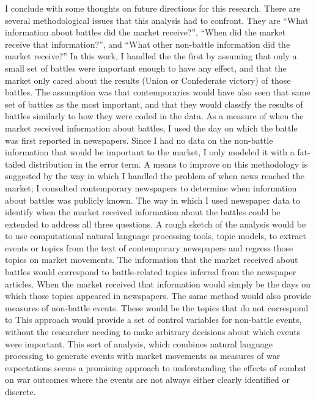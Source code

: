 I conclude with some thoughts on future directions for this research.
There are several methodological issues that this analysis had to confront.
They are ``What information about battles did the market receive?'', ``When did the market receive that information?'', and ``What other non-battle information did the market receive?''
In this work, I handled the the first by assuming that only a small set of battles were important enough to have any effect, and that the market only cared about the results (Union or Confederate victory) of those battles.
The assumption was that contemporaries would have also seen that same set of  battles as the most important, and that they would classify the results of battles similarly to how they were coded in the data.
As a measure of when the market received information about battles, I used the day on which the battle was first reported in newspapers.
Since I had no data on the non-battle information that would be important to the market, I only modeled it with a fat-tailed distribution in the error term.
A means to improve on this methodology is suggested by the way in which I handled the problem of when news reached the market; I consulted contemporary newspapers to determine when information about battles was publicly known.
The way in which I used newspaper data to identify when the market received information about the battles could be extended to address all three questions.
A rough sketch of the analysis would be to use computational natural language processing tools, \eg{}topic models, to extract events or topics from the text of contemporary newspapers and regress those topics on market movements.
The information that the market received about battles would correspond to battle-related topics inferred from the newspaper articles.
When the market received that information would simply be the days on which those topics appeared in newspapers.
The same method would also provide measures of non-battle events.
These would be the topics that do not correspond to 
This approach would provide a set of control variables for non-battle events, without the researcher needing to make arbitrary decisions about which events were important.
This sort of analysis, which combines natural language processing to generate events with market movements as measures of war expectations seems a promising approach to understanding the effects of combat on war outcomes where the events are not always either clearly identified or discrete. 



